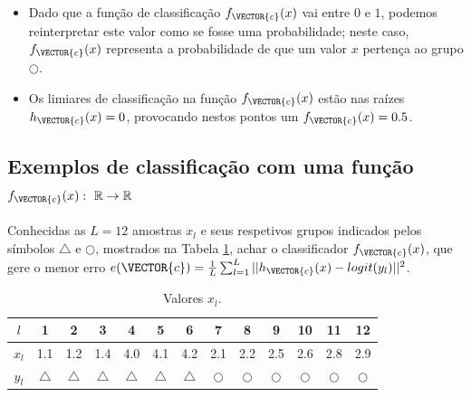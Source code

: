\begin{tcbattention}
\begin{itemize}
\item Dado que a função de classificação $f_{\VECTOR{c}}(x)$ vai entre $0$ e $1$,
podemos reinterpretar este valor como se fosse uma probabilidade;
neste caso, $f_{\VECTOR{c}}(x)$ representa a probabilidade de que um valor $x$
pertença ao grupo $\bigcirc$.
\item Os limiares de classificação na função $f_{\VECTOR{c}}(x)$ estão nas raízes $h_{\VECTOR{c}}(x)=0$,
provocando nestos pontos um $f_{\VECTOR{c}}(x)=0.5$.
\end{itemize}
\end{tcbattention}



\subsection{Exemplos de classificação com uma função
$f_{\VECTOR{c}}(x):~\mathbb{R} \rightarrow \mathbb{R}$ }

\begin{example}\label{ex:theo:reglogr1r1poly}
Conhecidas as $L=12$ amostras $x_l$ e seus respetivos grupos indicados pelos símbolos $\bigtriangleup$ e $\bigcirc$, 
mostrados na Tabela \ref{table:theo:reglogr1r1poly:xn},
achar o classificador $f_{\VECTOR{c}}(x)$, 
que gere o menor erro $e(\VECTOR{c}) =  \frac{1}{L} \sum_{l=1}^{L} ||h_{\VECTOR{c}}(x)-logit(y_l)||^2$.
\end{example}


\begin{table}[h!]
\centering
\begin{tabular}{|c||c|c|c|c|c|c||c|c|c|c|c|c|} 
 \hline
$l$   & 1 & 2 & 3 & 4 & 5 & 6 & 7 & 8 & 9 & 10 & 11 & 12\\ \hline \hline
$x_l$ & 1.1 & 1.2 & 1.4 & 4.0 & 4.1 & 4.2 & 2.1 & 2.2 & 2.5 & 2.6 & 2.8 & 2.9 \\ \hline
$y_l$ & $\bigtriangleup$ & $\bigtriangleup$ & $\bigtriangleup$ & $\bigtriangleup$ & $\bigtriangleup$ & $\bigtriangleup$
      & $\bigcirc$ & $\bigcirc$ & $\bigcirc$ & $\bigcirc$ & $\bigcirc$ & $\bigcirc$ \\ \hline
\end{tabular}
\caption{Valores $x_l$.}
\label{table:theo:reglogr1r1poly:xn}
\end{table}


